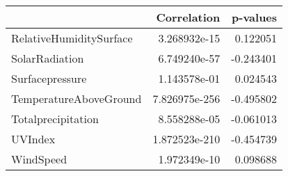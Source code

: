 \begin{tabular}{lrr}
\toprule
{} &    Correlation &  p-values \\
\midrule
RelativeHumiditySurface &   3.268932e-15 &  0.122051 \\
SolarRadiation          &   6.749240e-57 & -0.243401 \\
Surfacepressure         &   1.143578e-01 &  0.024543 \\
TemperatureAboveGround  &  7.826975e-256 & -0.495802 \\
Totalprecipitation      &   8.558288e-05 & -0.061013 \\
UVIndex                 &  1.872523e-210 & -0.454739 \\
WindSpeed               &   1.972349e-10 &  0.098688 \\
\bottomrule
\end{tabular}
